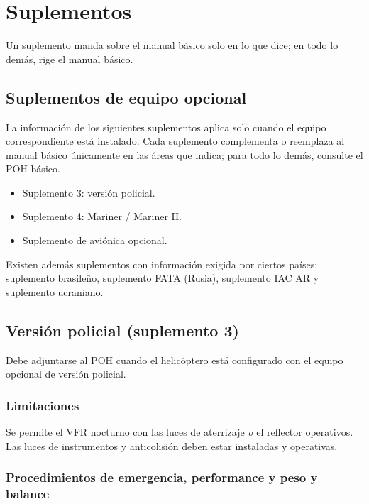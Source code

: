 \chapter{Suplementos}
\label{cap:suplementos}

\opening{Un suplemento manda sobre el manual básico solo en lo que dice; en todo lo demás, rige el manual básico.}

\section{Suplementos de equipo opcional}

La información de los siguientes suplementos aplica solo cuando el equipo correspondiente está instalado. Cada suplemento complementa o reemplaza al manual básico únicamente en las áreas que indica; para todo lo demás, consulte el POH básico.

\begin{itemize}
\item Suplemento 3: versión policial.
\item Suplemento 4: Mariner / Mariner II.
\item Suplemento de aviónica opcional.
\end{itemize}

Existen además suplementos con información exigida por ciertos países: suplemento brasileño, suplemento FATA (Rusia), suplemento IAC AR y suplemento ucraniano.

\section{Versión policial (suplemento 3)}

Debe adjuntarse al POH cuando el helicóptero está configurado con el equipo opcional de versión policial.

\subsection{Limitaciones}

Se permite el VFR nocturno con las luces de aterrizaje \emph{o} el reflector operativos. Las luces de instrumentos y anticolisión deben estar instaladas y operativas.

\subsection{Procedimientos de emergencia, performance y peso y balance}

